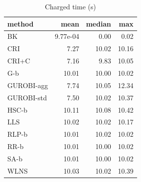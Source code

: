 \begin{table}[htbp]
\centering
\small
\caption{Charged time (s)}
\label{tab:E4a_equal_budgets_b10_time}
\begin{tabular}{lrrr}
\toprule
method & mean & median & max \\
\midrule
BK & 9.77e-04 & 0.00 & 0.02 \\
CRI & 7.27 & 10.02 & 10.16 \\
CRI+C & 7.16 & 9.83 & 10.05 \\
G-b & 10.01 & 10.00 & 10.02 \\
GUROBI-agg & 7.74 & 10.05 & 12.34 \\
GUROBI-std & 7.50 & 10.02 & 10.37 \\
HSC-b & 10.11 & 10.08 & 10.42 \\
LLS & 10.02 & 10.02 & 10.17 \\
RLP-b & 10.01 & 10.02 & 10.02 \\
RR-b & 10.01 & 10.00 & 10.02 \\
SA-b & 10.01 & 10.00 & 10.02 \\
WLNS & 10.03 & 10.02 & 10.39 \\
\bottomrule
\end{tabular}
\end{table}
